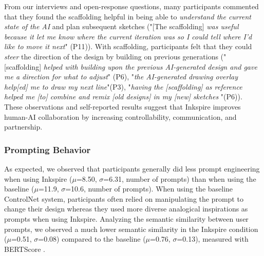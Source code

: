\documentclass[sigconf, screen]{acmart}
\begin{document}
From our interviews and open-response questions, many participants commented that they found the scaffolding helpful in being able to \textit{understand the current state of the AI} and plan subsequent sketches ("[The scaffolding] \textit{was useful because it let me know where the current iteration was so I could tell where I'd like to move it next}" (P11)). With scaffolding, participants felt that they could \textit{steer} the direction of the design by building on previous generations ("[scaffolding] \textit{helped with building upon the previous AI-generated design and gave me a direction for what to adjust}" (P6), "\textit{the AI-generated drawing overlay help[ed] me to draw my next line}"(P3), "\textit{having the [scaffolding] as reference helped me [to] combine and remix [old designs] in my [new] sketches }"(P6)).
These observations and self-reported results suggest that Inkspire improves human-AI collaboration by increasing controllability, communication, and partnership.


\subsubsection{Prompting Behavior}
As expected, we observed that participants generally did less prompt engineering when using Inkspire ($\mu$=8.50,  $\sigma$=6.31, number of prompts) than when using the baseline ($\mu$=11.9,  $\sigma$=10.6, number of prompts). 
When using the baseline ControlNet system, participants often relied on manipulating the prompt to change their design whereas they used more diverse analogical inspirations as prompts when using Inkspire.
Analyzing the semantic similarity between user prompts, we observed a much lower semantic similarity in the Inkspire condition ($\mu$=0.51, $\sigma$=0.08) compared to the baseline ($\mu$=0.76, $\sigma$=0.13), measured with BERTScore \cite{zhang2019bertscore}.
\end{document}
